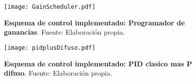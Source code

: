     \pagebreak
    
    \vfill

    \begin{figure}[htb]
        \centering
        \texttt{[image: GainScheduler.pdf]}
        \caption[Esquema de control implementado: Programador de ganancias]{\textbf{Esquema de control implementado: Programador de ganancias}. Fuente: Elaboración propia.} 
        \label{fig:GainScheduler}
    \end{figure}
    
    \vfill

    \begin{figure}[htb]
        \centering
        \texttt{[image: pidplusDifuso.pdf]}
        \caption[Esquema de control implementado: PID clasico mas P difuso]{\textbf{Esquema de control implementado: PID clasico mas P difuso}. Fuente: Elaboración propia.} 
        \label{fig:pidplusDifuso}
    \end{figure}
    
    \vfill

